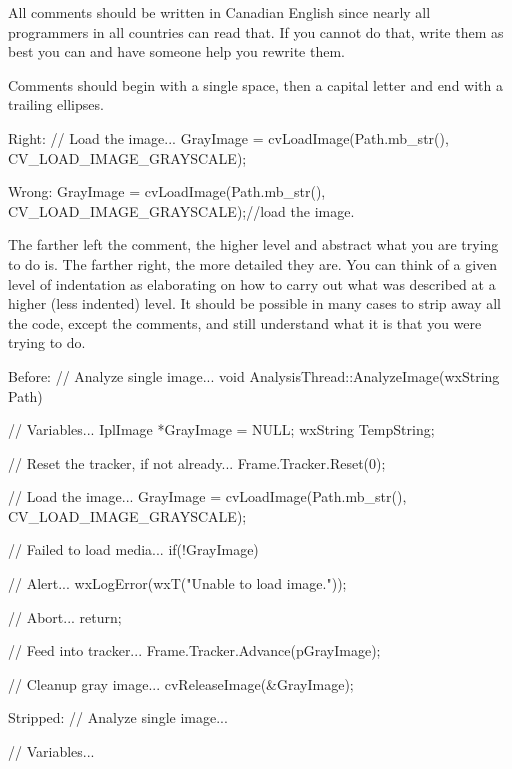 \startitemize[3]
\setupwhitespace[big]
\item
All comments should be written in Canadian English since nearly all programmers in all countries can read that. If you cannot do that, write them as best you can and have someone help you rewrite them.

\item
Comments should begin with a single space, then a capital letter and end with a trailing ellipses. 

Right:
\StartCodeExample
\starttyping
// Load the image...
GrayImage = cvLoadImage(Path.mb_str(), CV_LOAD_IMAGE_GRAYSCALE);
\stoptyping
\StopCodeExample

Wrong:
\StartCodeExample
\starttyping
GrayImage = cvLoadImage(Path.mb_str(), CV_LOAD_IMAGE_GRAYSCALE);//load the image.
\stoptyping
\StopCodeExample

\item
The farther left the comment, the higher level and abstract what you are trying to do is. The farther right, the more detailed they are. You can think of a given level of indentation as elaborating on how to carry out what was described at a higher (less indented) level. It should be possible in many cases to strip away all the code, except the comments, and still understand what it is that you were trying to do.

Before:
\StartCodeExample
\starttyping
// Analyze single image...
void AnalysisThread::AnalyzeImage(wxString Path)
{
    // Variables...
    IplImage   *GrayImage   = NULL;
    wxString    TempString;

    // Reset the tracker, if not already...
    Frame.Tracker.Reset(0);

    // Load the image...
    GrayImage = cvLoadImage(Path.mb_str(), CV_LOAD_IMAGE_GRAYSCALE);

        // Failed to load media...
        if(!GrayImage)
        {
            // Alert...
            wxLogError(wxT("Unable to load image."));
            
            // Abort...
            return;
        }

    // Feed into tracker...
    Frame.Tracker.Advance(pGrayImage);
    
    // Cleanup gray image...
    cvReleaseImage(&GrayImage);
}
\stoptyping
\StopCodeExample

Stripped:
\StartCodeExample
\starttyping
// Analyze single image...

    // Variables...

